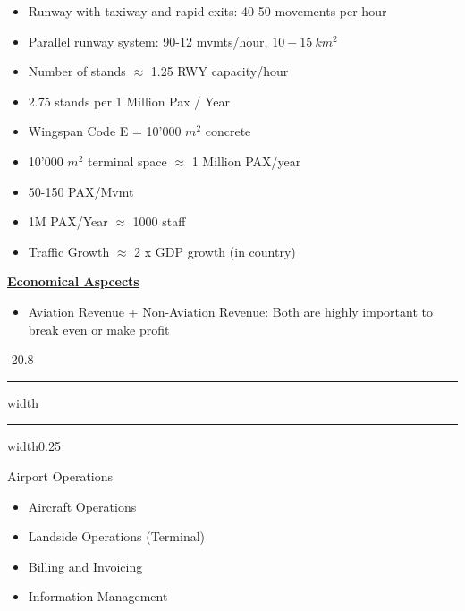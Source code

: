 \documentclass[9pt, landscape, fleqn]{scrartcl}
\makeatletter
\renewcommand{\section}{\@startsection{section}{1}{0mm}%
{-2\baselineskip}{0.8\baselineskip}%
{\hrule depth 0.2pt width\columnwidth\hrule depth1.5pt
width0.25\columnwidth\vspace*{1.2em}\Large\bfseries\rmfamily}}
\makeatother
\begin{document}
\begin{multicols*}{3}
\begin{itemize}
    \item Runway with taxiway and rapid exits: 40-50 movements per hour 
    \item Parallel runway system: 90-12 mvmts/hour, $10-15~km^2$
    \item Number of stands $\approx$ 1.25 RWY capacity/hour
    \item 2.75 stands per 1 Million Pax / Year 
    \item Wingspan Code E = 10'000 $m^2$ concrete 
    \item 10'000 $m^2$ terminal space $\approx$ 1 Million PAX/year 
    \item 50-150 PAX/Mvmt 
    \item 1M PAX/Year $\approx$ 1000 staff 
    \item Traffic Growth $\approx$ 2 x GDP growth (in country)
\end{itemize}
\underline{\textbf{Economical Aspcects}}
\begin{itemize}
    \item Aviation Revenue + Non-Aviation Revenue: Both are highly important to break even or make profit 
\end{itemize}
\newpage 
\section{Airport Operations}
\begin{itemize}
    \item Aircraft Operations
    \item Landside Operations (Terminal)
    \item Billing and Invoicing 
    \item Information Management 
\end{itemize}

\end{multicols*}
\end{document}
